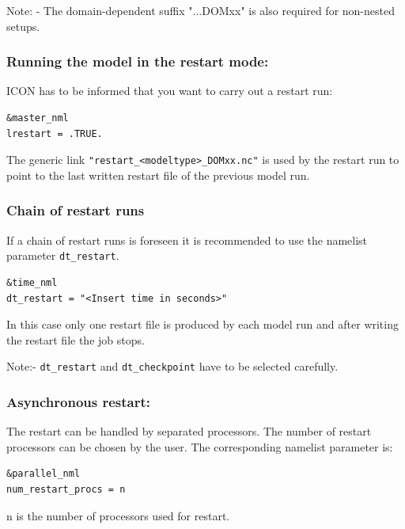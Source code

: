      
     
 
Note:
    -  The domain-dependent suffix "...DOMxx" is also required for 
non-nested setups.

    


\subsubsection{Running the model in the restart mode:}

ICON has to be informed that you want to carry out a restart run:

\begin{verbatim}
&master_nml
lrestart = .TRUE. 
\end{verbatim}

The generic link \verb+"restart_<modeltype>_DOMxx.nc"+ is used by the restart run to point to the last written restart file of the previous model run. 


\subsubsection*{Chain of restart runs}

If a chain of restart runs is foreseen it is recommended to use the namelist parameter
\verb+dt_restart+. 

\begin{verbatim}
&time_nml
dt_restart = "<Insert time in seconds>" 
\end{verbatim}


In this case only one restart file is produced by each model run and after writing the restart file the job stops.

Note:- \verb+dt_restart+ and \verb+dt_checkpoint+ have to be selected carefully. 
 


\subsubsection*{Asynchronous restart:} 

The restart can be handled by separated processors. The number of restart processors can be chosen by the user. The corresponding namelist parameter is:

\begin{verbatim}
&parallel_nml
num_restart_procs = n
\end{verbatim} 

n is the number of processors used for restart.


